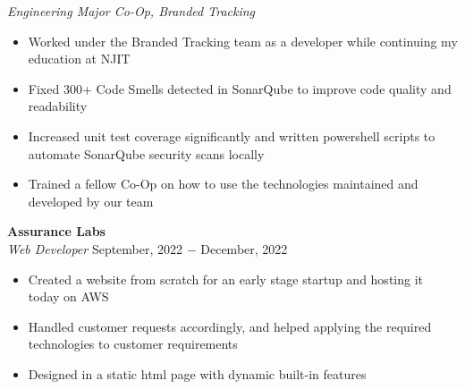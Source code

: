 \documentclass{article}
\begin{document}
\textit{Engineering Major Co-Op, Branded Tracking} 
\begin{itemize}[noitemsep,nolistsep,leftmargin=*]
\item {Worked under the Branded Tracking team as a developer while continuing my education at NJIT}
\item {Fixed 300+ Code Smells detected in SonarQube to improve code quality and readability}
\item {Increased unit test coverage significantly and written powershell scripts to automate SonarQube security scans locally}
\item {Trained a fellow Co-Op on how to use the technologies maintained and developed by our team}\\
\end{itemize}

\noindent \textbf{Assurance Labs} \\
\textit{Web Developer} \hfill September, 2022 $-$ December, 2022
\begin{itemize}[noitemsep,nolistsep,leftmargin=*]
\item {Created a website from scratch for an early stage startup and hosting it today on AWS}
\item {Handled customer requests accordingly, and helped applying the required technologies to customer requirements}
\item {Designed in a static html page with dynamic built-in features\\}
\end{itemize}



\end{document}
